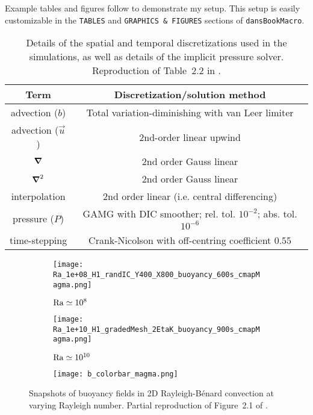Example tables and figures follow to demonstrate my setup.
This setup is easily customizable in the \verb!TABLES! and \verb!GRAPHICS & FIGURES! sections of \verb!dansBookMacro!.

\begin{center}
\begin{table}[t!hb]
\centering
    \begin{tabular}{ c | c }
    Term                    & Discretization/solution method        \\
    \hline
    \hline
    advection ($b$)         & Total variation-diminishing with van Leer limiter \\
    advection ($\vec{u}$)   & 2nd-order linear upwind   \\
    $\grad$                 & 2nd order Gauss linear    \\
    $\grad^2$            & 2nd order Gauss linear    \\
    interpolation           & 2nd order linear (i.e. central differencing)  \\
    pressure ($P$)          & GAMG with DIC smoother; rel. tol. $10^{-2}$; abs. tol. $10^{-6}$  \\
    \hline
    time-stepping           & Crank-Nicolson with off-centring coefficient $0.55$
    \end{tabular}
    \caption[Example table.]{
        Details of the spatial and temporal discretizations used in the simulations, as well as details of the implicit pressure solver.
        Reproduction of Table~2.2 in \textcite{phd:Shipley2021}.
    }
    \label{tab:solverDetails}
\end{table}
\end{center}
\begin{figure}[htb]
    \centering
    \begin{subfigure}{0.49\textwidth}
        \caption{$\operatorname{Ra} \simeq 10^8$}
        \texttt{[image: Ra\_1e+08\_H1\_randIC\_Y400\_X800\_buoyancy\_600s\_cmapMagma.png]}
    \end{subfigure}
    \begin{subfigure}{0.49\textwidth}
        \caption{$\operatorname{Ra} \simeq 10^{10}$}
        \texttt{[image: Ra\_1e+10\_H1\_gradedMesh\_2EtaK\_buoyancy\_900s\_cmapMagma.png]}
    \end{subfigure}
    \begin{subfigure}[c]{\textwidth}
        \caption*{}
        \texttt{[image: b\_colorbar\_magma.png]}
    \end{subfigure}
    \caption[Example small figure.]{
        Snapshots of buoyancy fields in 2D Rayleigh-B\'{e}nard convection at varying Rayleigh number.
        Partial reproduction of Figure~2.1 of \textcite{phd:Shipley2021}.
    }\label{fig:DNS_RBCexamples}
\end{figure}
